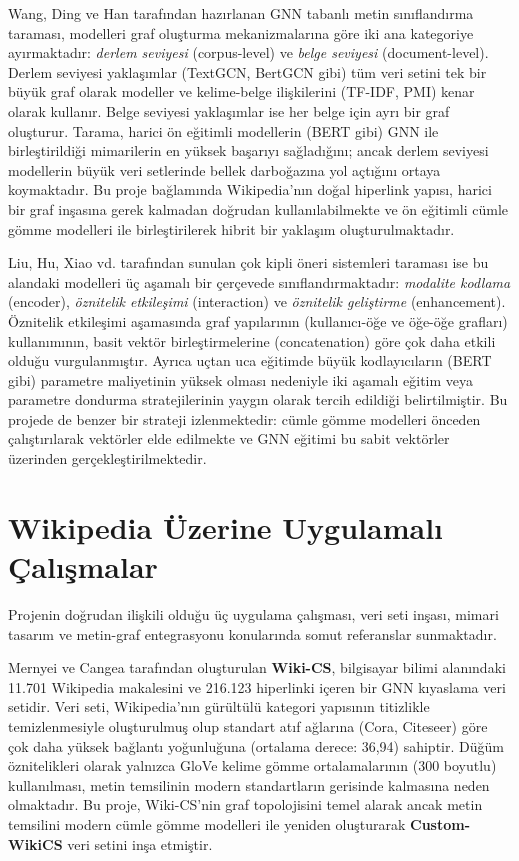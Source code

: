 Wang, Ding ve Han \cite{li2022graph} tarafından hazırlanan GNN tabanlı metin sınıflandırma taraması, modelleri graf oluşturma mekanizmalarına göre iki ana kategoriye ayırmaktadır: \textit{derlem seviyesi} (corpus-level) ve \textit{belge seviyesi} (document-level). Derlem seviyesi yaklaşımlar (TextGCN, BertGCN gibi) tüm veri setini tek bir büyük graf olarak modeller ve kelime-belge ilişkilerini (TF-IDF, PMI) kenar olarak kullanır. Belge seviyesi yaklaşımlar ise her belge için ayrı bir graf oluşturur. Tarama, harici ön eğitimli modellerin (BERT gibi) GNN ile birleştirildiği mimarilerin en yüksek başarıyı sağladığını; ancak derlem seviyesi modellerin büyük veri setlerinde bellek darboğazına yol açtığını ortaya koymaktadır. Bu proje bağlamında Wikipedia'nın doğal hiperlink yapısı, harici bir graf inşasına gerek kalmadan doğrudan kullanılabilmekte ve ön eğitimli cümle gömme modelleri ile birleştirilerek hibrit bir yaklaşım oluşturulmaktadır.

Liu, Hu, Xiao vd.\@ \cite{zhou2023multimodal} tarafından sunulan çok kipli öneri sistemleri taraması ise bu alandaki modelleri üç aşamalı bir çerçevede sınıflandırmaktadır: \textit{modalite kodlama} (encoder), \textit{öznitelik etkileşimi} (interaction) ve \textit{öznitelik geliştirme} (enhancement). Öznitelik etkileşimi aşamasında graf yapılarının (kullanıcı-öğe ve öğe-öğe grafları) kullanımının, basit vektör birleştirmelerine (concatenation) göre çok daha etkili olduğu vurgulanmıştır. Ayrıca uçtan uca eğitimde büyük kodlayıcıların (BERT gibi) parametre maliyetinin yüksek olması nedeniyle iki aşamalı eğitim veya parametre dondurma stratejilerinin yaygın olarak tercih edildiği belirtilmiştir. Bu projede de benzer bir strateji izlenmektedir: cümle gömme modelleri önceden çalıştırılarak vektörler elde edilmekte ve GNN eğitimi bu sabit vektörler üzerinden gerçekleştirilmektedir.

\section{Wikipedia Üzerine Uygulamalı Çalışmalar}

Projenin doğrudan ilişkili olduğu üç uygulama çalışması, veri seti inşası, mimari tasarım ve metin-graf entegrasyonu konularında somut referanslar sunmaktadır.

Mernyei ve Cangea \cite{mernyei2020wikics} tarafından oluşturulan \textbf{Wiki-CS}, bilgisayar bilimi alanındaki 11.701 Wikipedia makalesini ve 216.123 hiperlinki içeren bir GNN kıyaslama veri setidir. Veri seti, Wikipedia'nın gürültülü kategori yapısının titizlikle temizlenmesiyle oluşturulmuş olup standart atıf ağlarına (Cora, Citeseer) göre çok daha yüksek bağlantı yoğunluğuna (ortalama derece: 36,94) sahiptir. Düğüm öznitelikleri olarak yalnızca GloVe kelime gömme ortalamalarının (300 boyutlu) kullanılması, metin temsilinin modern standartların gerisinde kalmasına neden olmaktadır. Bu proje, Wiki-CS'nin graf topolojisini temel alarak ancak metin temsilini modern cümle gömme modelleri ile yeniden oluşturarak \textbf{Custom-WikiCS} veri setini inşa etmiştir.

